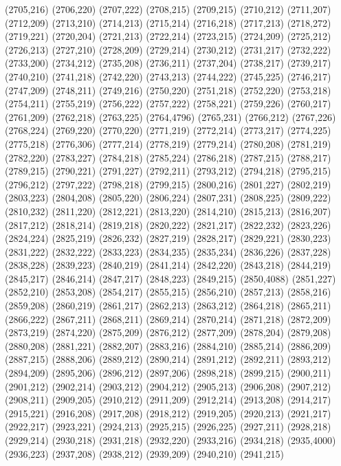(2705,216)
(2706,220)
(2707,222)
(2708,215)
(2709,215)
(2710,212)
(2711,207)
(2712,209)
(2713,210)
(2714,213)
(2715,214)
(2716,218)
(2717,213)
(2718,272)
(2719,221)
(2720,204)
(2721,213)
(2722,214)
(2723,215)
(2724,209)
(2725,212)
(2726,213)
(2727,210)
(2728,209)
(2729,214)
(2730,212)
(2731,217)
(2732,222)
(2733,200)
(2734,212)
(2735,208)
(2736,211)
(2737,204)
(2738,217)
(2739,217)
(2740,210)
(2741,218)
(2742,220)
(2743,213)
(2744,222)
(2745,225)
(2746,217)
(2747,209)
(2748,211)
(2749,216)
(2750,220)
(2751,218)
(2752,220)
(2753,218)
(2754,211)
(2755,219)
(2756,222)
(2757,222)
(2758,221)
(2759,226)
(2760,217)
(2761,209)
(2762,218)
(2763,225)
(2764,4796)
(2765,231)
(2766,212)
(2767,226)
(2768,224)
(2769,220)
(2770,220)
(2771,219)
(2772,214)
(2773,217)
(2774,225)
(2775,218)
(2776,306)
(2777,214)
(2778,219)
(2779,214)
(2780,208)
(2781,219)
(2782,220)
(2783,227)
(2784,218)
(2785,224)
(2786,218)
(2787,215)
(2788,217)
(2789,215)
(2790,221)
(2791,227)
(2792,211)
(2793,212)
(2794,218)
(2795,215)
(2796,212)
(2797,222)
(2798,218)
(2799,215)
(2800,216)
(2801,227)
(2802,219)
(2803,223)
(2804,208)
(2805,220)
(2806,224)
(2807,231)
(2808,225)
(2809,222)
(2810,232)
(2811,220)
(2812,221)
(2813,220)
(2814,210)
(2815,213)
(2816,207)
(2817,212)
(2818,214)
(2819,218)
(2820,222)
(2821,217)
(2822,232)
(2823,226)
(2824,224)
(2825,219)
(2826,232)
(2827,219)
(2828,217)
(2829,221)
(2830,223)
(2831,222)
(2832,222)
(2833,223)
(2834,235)
(2835,234)
(2836,226)
(2837,228)
(2838,228)
(2839,223)
(2840,219)
(2841,214)
(2842,220)
(2843,218)
(2844,219)
(2845,217)
(2846,214)
(2847,217)
(2848,223)
(2849,215)
(2850,4088)
(2851,227)
(2852,210)
(2853,208)
(2854,217)
(2855,215)
(2856,210)
(2857,213)
(2858,216)
(2859,208)
(2860,219)
(2861,217)
(2862,213)
(2863,212)
(2864,218)
(2865,211)
(2866,222)
(2867,211)
(2868,211)
(2869,214)
(2870,214)
(2871,218)
(2872,209)
(2873,219)
(2874,220)
(2875,209)
(2876,212)
(2877,209)
(2878,204)
(2879,208)
(2880,208)
(2881,221)
(2882,207)
(2883,216)
(2884,210)
(2885,214)
(2886,209)
(2887,215)
(2888,206)
(2889,212)
(2890,214)
(2891,212)
(2892,211)
(2893,212)
(2894,209)
(2895,206)
(2896,212)
(2897,206)
(2898,218)
(2899,215)
(2900,211)
(2901,212)
(2902,214)
(2903,212)
(2904,212)
(2905,213)
(2906,208)
(2907,212)
(2908,211)
(2909,205)
(2910,212)
(2911,209)
(2912,214)
(2913,208)
(2914,217)
(2915,221)
(2916,208)
(2917,208)
(2918,212)
(2919,205)
(2920,213)
(2921,217)
(2922,217)
(2923,221)
(2924,213)
(2925,215)
(2926,225)
(2927,211)
(2928,218)
(2929,214)
(2930,218)
(2931,218)
(2932,220)
(2933,216)
(2934,218)
(2935,4000)
(2936,223)
(2937,208)
(2938,212)
(2939,209)
(2940,210)
(2941,215)
